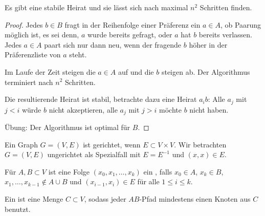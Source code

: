 \begin{st}
    Es gibt eine stabile Heirat und sie lässt sich nach maximal $n^2$ Schritten finden.
    \begin{proof}
        Jedes $b \in B$ fragt in der Reihenfolge einer Präferenz ein $a \in A$, ob Paarung möglich ist, es sei denn, $a$ wurde bereits gefragt, oder $a$ hat $b$ bereits verlassen.
        Jedes $a \in A$ paart sich nur dann neu, wenn der fragende $b$ höher in der Präferenzliste von $a$ steht.

        Im Laufe der Zeit steigen die $a \in A$ auf und die $b$ steigen ab.
        Der Algorithmus terminiert nach $n^2$ Schritten.

        Die resultierende Heirat ist stabil, betrachte dazu eine Heirat $a_i b$:
        Alle $a_j$ mit $j < i$ würde $b$ nicht akzeptieren, alle $a_j$ mit $j > i$ möchte $b$ nicht haben.

        Übung: Der Algorithmus ist optimal für $B$.
    \end{proof}
\end{st}

\begin{df}
    Ein Graph $G = (V, E)$ ist gerichtet, wenn $E \subset V \times V$.
    Wir betrachten $G = (V, E)$ ungerichtet als Spezialfall mit $E = E^{-1}$ und $(x,x) \in E$.

    Für $A, B \subset V$ ist eine Folge $(x_0, x_1, \dotsc, x_k)$ ein , falls $x_0 \in A$, $x_k \in B$,
    $x_1, \dotsc, x_{k-1} \not\in A \cup B$ und $(x_{i-1}, x_i) \in E$ für alle $1 \le i \le k$.

    Ein  ist eine Menge $C \subset V$, sodass jeder $AB$-Pfad mindestens einen Knoten aus $C$ benutzt.
\end{df}

